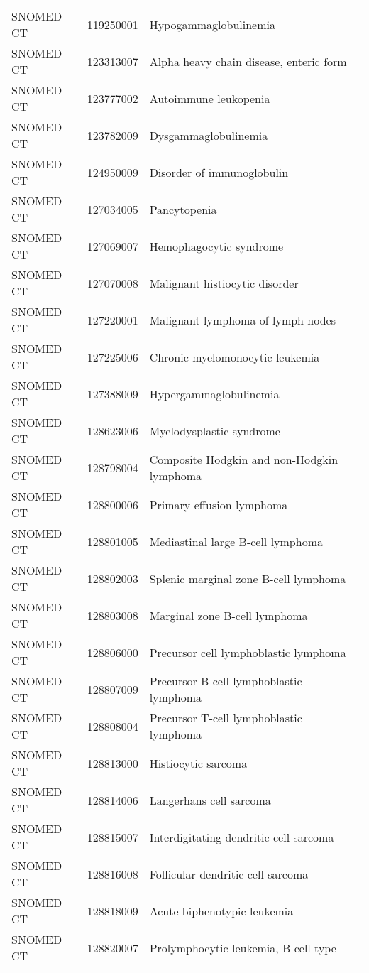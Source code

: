\begin{longtable}{p{}p{}p{}}
  SNOMED CT & 119250001 & Hypogammaglobulinemia \\ 
  SNOMED CT & 123313007 & Alpha heavy chain disease, enteric form \\ 
  SNOMED CT & 123777002 & Autoimmune leukopenia \\ 
  SNOMED CT & 123782009 & Dysgammaglobulinemia \\ 
  SNOMED CT & 124950009 & Disorder of immunoglobulin \\ 
  SNOMED CT & 127034005 & Pancytopenia \\ 
  SNOMED CT & 127069007 & Hemophagocytic syndrome \\ 
  SNOMED CT & 127070008 & Malignant histiocytic disorder \\ 
  SNOMED CT & 127220001 & Malignant lymphoma of lymph nodes \\ 
  SNOMED CT & 127225006 & Chronic myelomonocytic leukemia \\ 
  SNOMED CT & 127388009 & Hypergammaglobulinemia \\ 
  SNOMED CT & 128623006 & Myelodysplastic syndrome \\ 
  SNOMED CT & 128798004 & Composite Hodgkin and non-Hodgkin lymphoma \\ 
  SNOMED CT & 128800006 & Primary effusion lymphoma \\ 
  SNOMED CT & 128801005 & Mediastinal large B-cell lymphoma \\ 
  SNOMED CT & 128802003 & Splenic marginal zone B-cell lymphoma \\ 
  SNOMED CT & 128803008 & Marginal zone B-cell lymphoma \\ 
  SNOMED CT & 128806000 & Precursor cell lymphoblastic lymphoma \\ 
  SNOMED CT & 128807009 & Precursor B-cell lymphoblastic lymphoma \\ 
  SNOMED CT & 128808004 & Precursor T-cell lymphoblastic lymphoma \\ 
  SNOMED CT & 128813000 & Histiocytic sarcoma \\ 
  SNOMED CT & 128814006 & Langerhans cell sarcoma \\ 
  SNOMED CT & 128815007 & Interdigitating dendritic cell sarcoma \\ 
  SNOMED CT & 128816008 & Follicular dendritic cell sarcoma \\ 
  SNOMED CT & 128818009 & Acute biphenotypic leukemia \\ 
  SNOMED CT & 128820007 & Prolymphocytic leukemia, B-cell type \\ 

\end{longtable}
